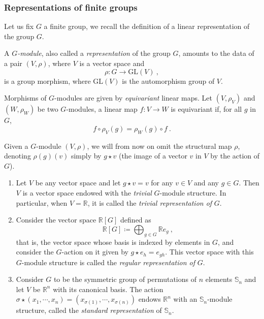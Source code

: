 \documentclass[a4paper,12pt]{amsart}
\begin{document}
\subsubsection{Representations of finite groups} Let us fix $G$ a finite group, we recall the definition of a linear representation of the group $G$. 

\begin{definition}[$G$-module]
A $G$\textit{-module}, also called a \textit{representation} of the group $G$, amounts 
to the data of a pair $(V,\rho)$, where $V$ is a vector space and 
\[
\rho: G \longrightarrow \mathrm{GL}(V)~,
\]
is a group morphism, where $\mathrm{GL}(V)$ is the automorphism group of $V$.
\end{definition}

Morphisms of $G$-modules are given by \textit{equivariant} linear maps. Let $(V,\rho_V)$ and $(W,\rho_W)$ be two $G$-modules, a linear map $f: V \longrightarrow W$ is equivariant if, for all $g$ in $G$, 
\[
f \circ \rho_V(g) = \rho_W(g) \circ f~.
\]

\begin{notation}
Given a $G$-module $(V,\rho)$, we will from now on omit the structural map $\rho$, denoting $\rho(g)(v)$ simply by $g \star v$ (the image of a vector $v$ in $V$ by the action of $G$). 
\end{notation}

\begin{example}\leavevmode
\begin{enumerate}
\item Let $V$ be any vector space and let $g \star v = v$ for any $v \in V$ and any $g \in G$. Then $V$ is a vector space endowed with the \textit{trivial} $G$-module structure. In particular, when $V = \mathbb{R}$, it is called the \textit{trivial representation of} $G$. 

\medskip

\item Consider the vector space $\mathbb{R}[G]$ defined as 
\[
\mathbb{R}[G] \coloneqq \bigoplus_{g \in G}\mathbb{R}e_g~,
\]
that is, the vector space whose basis is indexed by elements in $G$, and consider the $G$-action on it given by $g \star e_h = e_{gh}$. This vector space with this $G$-module structure is called the \textit{regular representation of }$G$. 

\medskip

\item Consider $G$ to be the symmetric group of permutations of $n$ elements $\mathbb{S}_n$ and let $V$ be $\mathbb{R}^n$
with its canonical basis. The action $\sigma \star (x_1,\cdots,x_n) = (x_{\sigma(1)},\cdots,x_{\sigma(n)})$ endows $\mathbb{R}^n$ with an $\mathbb{S}_n$-module structure, called the \textit{standard representation} of $\mathbb{S}_n$. 
\end{enumerate}
\end{example}
\end{document}
